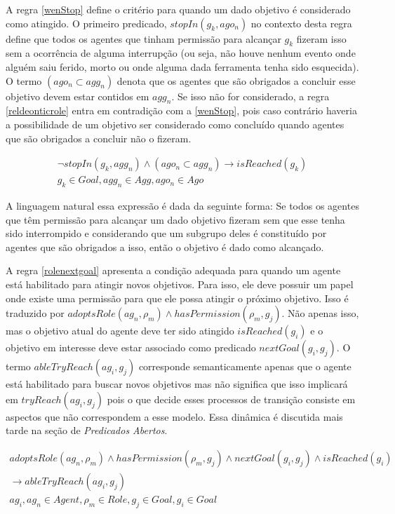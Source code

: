 A regra \ref{wenStop} define o critério para quando um dado objetivo é considerado como atingido. O primeiro predicado, $stopIn(g_k,ago_n)$ no contexto desta regra define que todos os agentes que tinham permissão para alcançar $g_k$ fizeram isso sem a ocorrência de alguma interrupção (ou seja, não houve nenhum evento onde alguém saiu ferido, morto ou onde alguma dada ferramenta tenha sido esquecida). O termo $(ago_n \subset agg_n)$ denota que os agentes que são obrigados a concluir esse objetivo devem estar contidos em $agg_n$. Se isso não for considerado, a regra \ref{reldeonticrole} entra em contradição com a \ref{wenStop}, pois caso contrário haveria a possibilidade de um objetivo ser considerado como concluído quando agentes que são obrigados a concluir não o fizeram. 

\begin{eqnarray}\label{wenStop}
	\neg stopIn(g_k,agg_n) \wedge (ago_n \subset agg_n) \to isReached(g_k) \nonumber \\ 
    g_k \in Goal, agg_n \in Agg, ago_n \in Ago 
\end{eqnarray}

A linguagem natural essa expressão é dada da seguinte forma: Se todos os agentes que têm permissão para alcançar um dado objetivo fizeram sem que esse tenha sido interrompido e considerando que um subgrupo deles é constituído por agentes que são obrigados a isso, então o objetivo é dado como alcançado.

A regra \ref{rolenextgoal} apresenta a condição adequada para quando um agente está habilitado para atingir novos objetivos. Para isso, ele deve possuir um papel onde existe uma permissão para que ele possa atingir o próximo objetivo. Isso é traduzido por $ adoptsRole(ag_n,\rho_m) \wedge hasPermission(\rho_m,g_j) $. Não apenas isso, mas o objetivo atual do agente deve ter sido atingido $ isReached(g_i) $ e o objetivo em interesse deve estar associado como predicado $nextGoal(g_i,g_j)$. O termo $ableTryReach(ag_i,g_j)$ corresponde semanticamente apenas que o agente está habilitado para buscar novos objetivos mas não significa que isso implicará em $tryReach(ag_i,g_j)$ pois o que decide esses processos de transição consiste em aspectos que não correspondem a esse modelo. Essa dinâmica é discutida mais tarde na seção de \textit{Predicados Abertos}.

\begin{eqnarray}\label{rolenextgoal}
	adoptsRole(ag_n,\rho_m) \wedge hasPermission(\rho_m,g_j) \wedge nextGoal(g_i,g_j) \wedge isReached(g_i) \nonumber \\
	\to ableTryReach(ag_i,g_j) \nonumber \\
    ag_i, ag_n \in Agent, \rho_m \in Role, g_j \in Goal, g_i \in Goal
\end{eqnarray}

